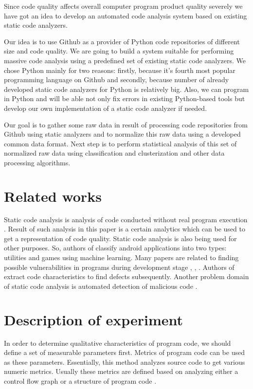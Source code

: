 Since code quality affects overall computer program product quality severely
we have got an idea to develop an automated code analysis system based on
existing static code analyzers.

Our idea is to use Github \cite{item16} as a provider of Python code repositories
of different size and code quality. We are going to build a system suitable for
performing massive code analysis using a predefined set of existing static code
analyzers. We chose Python mainly for two reasons: firstly, because it's fourth most popular
programming language on Github and secondly, because number of already developed
static code analyzers for Python is relatively big. Also, we can program in Python
and will be able not only fix errors in existing Python-based tools but develop
our own implementation of a static code analyzer if needed.

Our goal is to gather some raw data in result of processing code repositories from
Github using static analyzers and to normalize this raw data using a developed
common data format. Next step is to perform statistical analysis of this set of
normalized raw data using classification and clusterization and other data processing
algorithms.

\section{Related works}
Static code analysis is analysis of code conducted without real program
execution \cite{item05}. Result of such analysis in this paper is a certain analytics
which can be used to get a representation of code quality. Static code analysis
is also being used for other purposes. So, authors of \cite{item06} classify android
applications into two types: utilities and games using machine learning.
Many papers are related to finding possible vulnerabilities in programs
during development stage \cite{item07}, \cite{item08}, \cite{item09}. Authors of \cite{item10} extract code characteristics
to find defects subsequently. Another problem domain of static code analysis
is automated detection of malicious code \cite{item11}.

\section{Description of experiment}
In order to determine qualitative characteristics of program code, we should
define a set of measurable parameters first. Metrics of program code can
be used as these parameters. Essentially, this method analyzes source code
to get various numeric metrics. Usually these metrics are defined based
on analyzing either a control flow graph or a structure of program code \cite{item12}.


